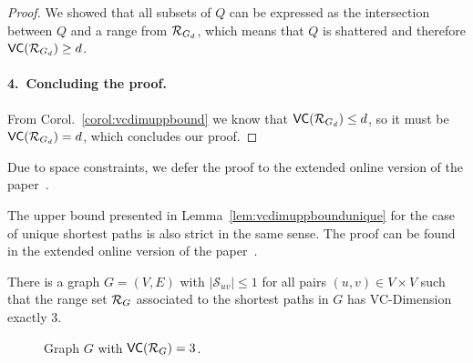 \begin{proof}
  We showed that all subsets of $Q$ can be expressed as the intersection between
  $Q$ and a range from $\mathcal{R}_{G_d}$, which means that $Q$ is shattered and
  therefore $\mathsf{VC}(\mathcal{R}_{G_d})\ge d$.
  
  \paragraph{4.~Concluding the proof.} From Corol.~\ref{corol:vcdimuppbound} we
  know that $\mathsf{VC}(\mathcal{R}_{G_d})\le d$, so it must be $\mathsf{VC}(\mathcal{R}_{G_d})=d$, which
  concludes our proof.
\end{proof}
\else
Due to space constraints, we defer the proof to the extended online version of
the paper~\citep{RiondatoK13}.
\fi

The upper bound presented in Lemma~\ref{lem:vcdimuppboundunique}  for the case
of unique shortest paths is also strict in the same sense.
\ifproof
\else
The proof can be found in the extended online version of the
paper~\citep{RiondatoK13}.
\fi

\begin{lemma}\label{lem:vcdimlowboundunique}
  There is a graph $G=(V,E)$ with $|\mathcal{S}_{uv}|\le1$ for all
  pairs $(u,v)\in V\times V$ such that the range set $\mathcal{R}_G$ associated to the
  shortest paths in $G$ has VC-Dimension exactly $3$.
\end{lemma}

\ifproof
\begin{figure}[ht]
  \centering
  \caption{Graph $G$ with $\mathsf{VC}(\mathcal{R}_G)= 3$.}
  \label{fig:uniquetight}
\end{figure}

